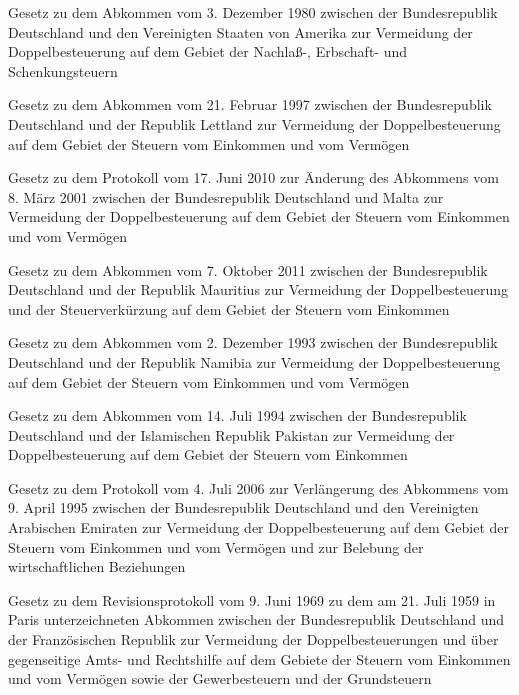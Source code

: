 \item[{DBAG-USA-1980}] Gesetz zu dem Abkommen vom 3. Dezember 1980 zwischen der Bundesrepublik Deutschland und den Vereinigten Staaten von Amerika zur Vermeidung der Doppelbesteuerung auf dem Gebiet der Nachlaß-, Erbschaft- und Schenkungsteuern

\item[{DBALETG}] Gesetz zu dem Abkommen vom 21. Februar 1997 zwischen der Bundesrepublik Deutschland und der Republik Lettland zur Vermeidung der Doppelbesteuerung auf dem Gebiet der Steuern vom Einkommen und vom Vermögen

\item[{DBAMLTÄndProtG}] Gesetz zu dem Protokoll vom 17. Juni 2010 zur Änderung des Abkommens vom 8. März 2001 zwischen der Bundesrepublik Deutschland und Malta zur Vermeidung der Doppelbesteuerung auf dem Gebiet der Steuern vom Einkommen und vom Vermögen

\item[{DBAMUSG}] Gesetz zu dem Abkommen vom 7. Oktober 2011 zwischen der Bundesrepublik Deutschland und der Republik Mauritius zur Vermeidung der Doppelbesteuerung und der Steuerverkürzung auf dem Gebiet der Steuern vom Einkommen

\item[{DBANAMG}] Gesetz zu dem Abkommen vom 2. Dezember 1993 zwischen der Bundesrepublik Deutschland und der Republik Namibia zur Vermeidung der Doppelbesteuerung auf dem Gebiet der Steuern vom Einkommen und vom Vermögen

\item[{DBAPAKG}] Gesetz zu dem Abkommen vom 14. Juli 1994 zwischen der Bundesrepublik Deutschland und der Islamischen Republik Pakistan zur Vermeidung der Doppelbesteuerung auf dem Gebiet der Steuern vom Einkommen

\item[{DBAProtVerArabEmG}] Gesetz zu dem Protokoll vom 4. Juli 2006 zur Verlängerung des Abkommens vom 9. April 1995 zwischen der Bundesrepublik Deutschland und den Vereinigten Arabischen Emiraten zur Vermeidung der Doppelbesteuerung auf dem Gebiet der Steuern vom Einkommen und vom Vermögen und zur Belebung der wirtschaftlichen Beziehungen

\item[{DBARevProtG-FRA}] Gesetz zu dem Revisionsprotokoll vom 9. Juni 1969 zu dem am 21. Juli 1959 in Paris unterzeichneten Abkommen zwischen der Bundesrepublik Deutschland und der Französischen Republik zur Vermeidung der Doppelbesteuerungen und über gegenseitige Amts- und Rechtshilfe auf dem Gebiete der Steuern vom Einkommen und vom Vermögen sowie der Gewerbesteuern und der Grundsteuern


